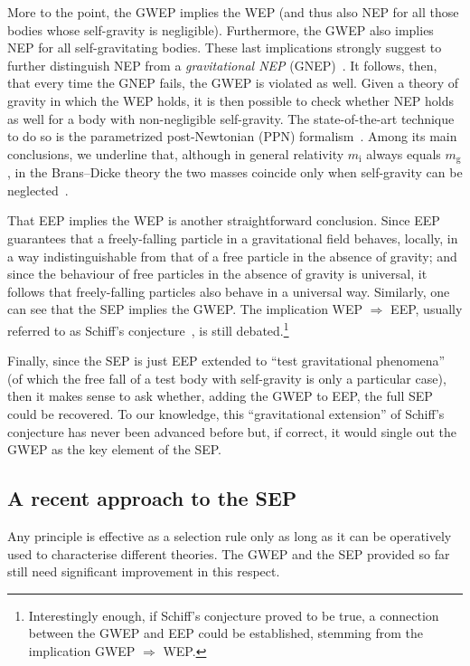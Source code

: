 \documentclass[a4paper,showkeys,aps,prd,reprint,nofootinbib,showpacs,twocolumn]{revtex4-1}
\newcommand{\eq}[1]{\( #1 \)}
\theoremstyle{plain}
\begin{document}
More to the point, the GWEP implies the WEP (and thus also NEP for all those bodies whose self-gravity is negligible).  Furthermore, the GWEP also implies NEP for all self-gravitating bodies. These last implications strongly suggest to further distinguish NEP from a \emph{gravitational NEP} (GNEP)~\cite{ess1}. It follows, then, that every time the GNEP fails, the GWEP is violated as well.  Given a theory of gravity in which the WEP holds, it is then possible to check whether NEP holds as well for a body with non-negligible self-gravity. The state-of-the-art technique to do so is the parametrized post-Newtonian (PPN) formalism~\cite{will, will2006lr}. Among its main conclusions, we underline that, although in general relativity \eq{m_{\text{i}}} always equals \eq{m_{\text{g}}}, in the Brans--Dicke theory the two masses coincide only when self-gravity can be neglected~\cite{nordtvedt}. 

That EEP implies the WEP is another straightforward conclusion. Since EEP guarantees that a freely-falling particle in a gravitational field behaves, locally, in a way indistinguishable from that of a free particle in the absence of gravity; and since the behaviour of free particles in the absence of gravity is universal, it follows that freely-falling particles also behave in a universal way.  Similarly, one can see that the SEP implies the GWEP.  The implication WEP \eq{\Rightarrow} EEP, usually referred to as Schiff's conjecture~\cite{will}, is still debated.\footnote{Interestingly enough, if Schiff's conjecture proved to be true, a connection between the GWEP and EEP could be established, stemming from the implication GWEP \eq{\Rightarrow} WEP.}

Finally, since the SEP is just EEP extended to ``test gravitational phenomena'' (of which the free fall of a test body with self-gravity is only a particular case), then it makes sense to ask whether, adding the GWEP to EEP, the full SEP could be recovered. To our knowledge, this ``gravitational extension'' of Schiff's conjecture has never been advanced before but, if correct, it would single out the GWEP as the key element of the SEP.

\subsection{A recent approach to the SEP}
\label{Ss:gerard}

Any principle is effective as a selection rule only as long as it can be operatively used to characterise different theories.  The GWEP and the SEP provided so far still need significant improvement in this respect.
\end{document}
